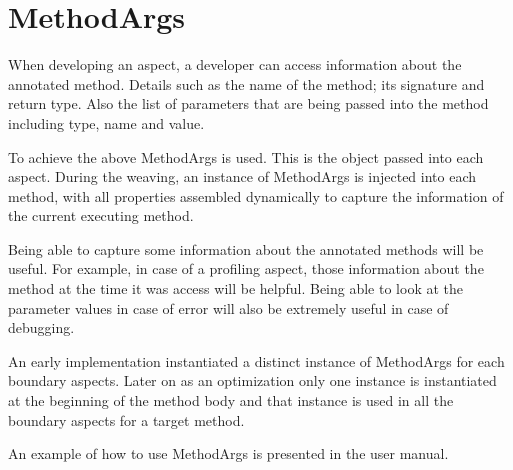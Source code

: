 \section{MethodArgs}

When developing an aspect, a developer can access information about the annotated method. Details such as the name of the method; its signature and return type. Also the list of parameters that are being passed into the method including type, name and value.

To achieve the above MethodArgs is used. This is the object passed into each aspect. During the weaving, an instance of MethodArgs is injected into each method, with all properties assembled dynamically to capture the information of the current executing method.

Being able to capture some information about the annotated methods will be useful. For example, in case of a profiling aspect, those information about the method at the time it was access will be helpful. Being able to look at the parameter values in case of error will also be extremely useful in case of debugging.

An early implementation instantiated a distinct instance of MethodArgs for each boundary aspects. Later on as an optimization only one instance is instantiated at the beginning of the method body and that instance is used in all the boundary aspects for a target method.

An example of how to use MethodArgs is presented in the user manual.
